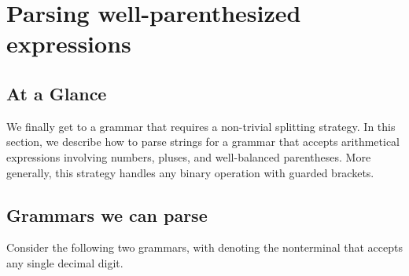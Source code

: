 \chapter{Parsing well-parenthesized expressions}
\section{At a Glance}
  We finally get to a grammar that requires a non-trivial splitting strategy.  In this section, we describe how to parse strings for a grammar that accepts arithmetical expressions involving numbers, pluses, and well-balanced parentheses.  More generally, this strategy handles any binary operation with guarded brackets.
  
\section{Grammars we can parse}
  Consider the following two grammars, with  denoting the nonterminal that accepts any single decimal digit.
  
